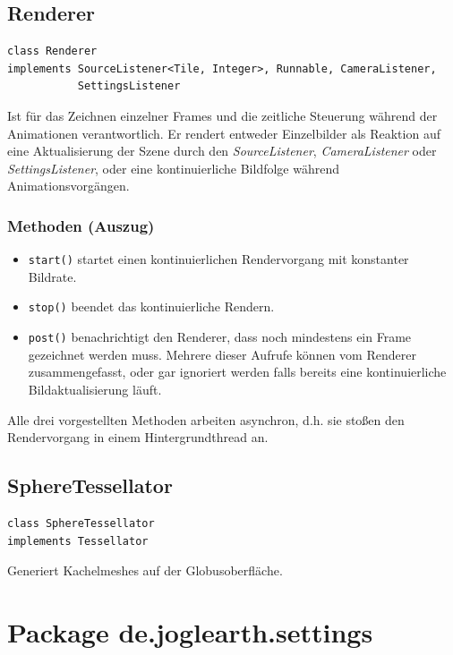 \documentclass[10pt]{scrreprt}
\begin{document}
\subsection*{Renderer}
\begin{lstlisting}
class Renderer
implements SourceListener<Tile, Integer>, Runnable, CameraListener,
           SettingsListener
\end{lstlisting}
Ist für das Zeichnen einzelner Frames und die zeitliche Steuerung während der Animationen verantwortlich. Er rendert entweder Einzelbilder als Reaktion auf eine Aktualisierung der Szene durch den \textit{SourceListener}, \textit{CameraListener} oder \textit{SettingsListener}, oder eine kontinuierliche Bildfolge während Animationsvorgängen.\\
\subsubsection*{Methoden (Auszug)}
\begin{itemize}
\item \texttt{start()} startet einen kontinuierlichen Rendervorgang mit konstanter Bildrate.
\item \texttt{stop()} beendet das kontinuierliche Rendern.
\item \texttt{post()} benachrichtigt den Renderer, dass noch mindestens ein Frame gezeichnet werden muss. Mehrere dieser Aufrufe können vom Renderer zusammengefasst, oder gar ignoriert werden falls bereits eine kontinuierliche Bildaktualisierung läuft.
\end{itemize}
Alle drei vorgestellten Methoden arbeiten asynchron, d.h. sie stoßen den Rendervorgang in einem Hintergrundthread an.

\vspace{5mm}
\subsection*{SphereTessellator}
\begin{lstlisting}
class SphereTessellator
implements Tessellator
\end{lstlisting}
Generiert Kachelmeshes auf der Globusoberfläche.\\




\vspace{5mm}
\section{Package de.joglearth.settings}
\end{document}
